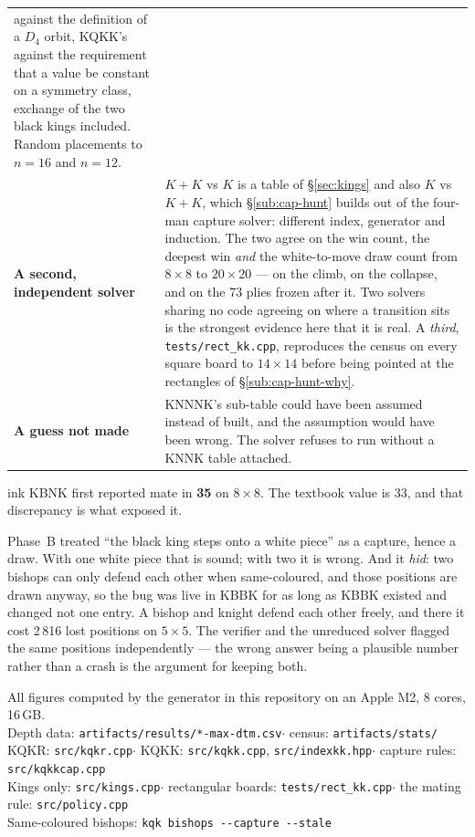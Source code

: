 \documentclass[10pt]{article}
\begin{document}
\begin{center}
\begin{tabular}{@{}lp{}@{}}
against the definition of a $D_4$ orbit, KQKK's against the requirement that a
value be constant on a symmetry class, exchange of the two black kings
included. Random placements to $n=16$ and $n=12$. \\[1.5mm]
\textbf{A second, independent solver} & $K\!+\!K$ vs $K$ is a table of
\S\ref{sec:kings} and also $K$ vs $K\!+\!K$, which \S\ref{sub:cap-hunt} builds
out of the four-man capture solver: different index, generator and induction.
The two agree on the win count, the deepest win \emph{and} the white-to-move
draw count from $8\times8$ to $20\times20$ --- on the climb, on the collapse,
and on the 73 plies frozen after it. Two solvers sharing no code agreeing on
where a transition sits is the strongest evidence here that it is real. A
\emph{third}, \texttt{tests/rect\_kk.cpp}, reproduces the census on every
square board to $14\times14$ before being pointed at the rectangles of
\S\ref{sub:cap-hunt-why}. \\[1.5mm]
\textbf{A guess not made} & KNNNK's sub-table could have been assumed instead
of built, and the assumption would have been wrong. The solver refuses to run
without a KNNK table attached. \\
\bottomrule
\end{tabular}
\end{center}

\begin{result}[title={The bug that mattered}]{ink}
KBNK first reported mate in \textbf{35} on $8\times8$. The textbook value is
33, and that discrepancy is what exposed it.

Phase~B treated ``the black king steps onto a white piece'' as a capture, hence
a draw. With one white piece that is sound; with two it is wrong. And it
\emph{hid}: two bishops can only defend each other when same-coloured, and
those positions are drawn anyway, so the bug was live in KBBK for as long as
KBBK existed and changed not one entry. A bishop and knight defend each other
freely, and there it cost 2\,816 lost positions on $5\times5$. The verifier and
the unreduced solver flagged the same positions independently --- the wrong
answer being a plausible number rather than a crash is the argument for keeping
both.
\end{result}

\vfill
\begin{center}\small\color{inksoft}
All figures computed by the generator in this repository on an Apple M2,
8 cores, 16\,GB.\\
Depth data: \texttt{artifacts/results/*-max-dtm.csv}\quad$\cdot$\quad
census: \texttt{artifacts/stats/}\\
KQKR: \texttt{src/kqkr.cpp}\quad$\cdot$\quad
KQKK: \texttt{src/kqkk.cpp}, \texttt{src/indexkk.hpp}\quad$\cdot$\quad
capture rules: \texttt{src/kqkkcap.cpp}\\
Kings only: \texttt{src/kings.cpp}\quad$\cdot$\quad
rectangular boards: \texttt{tests/rect\_kk.cpp}\quad$\cdot$\quad
the mating rule: \texttt{src/policy.cpp}\\
Same-coloured bishops: \texttt{kqk bishops -{}-capture -{}-stale}
\end{center}
\end{document}
